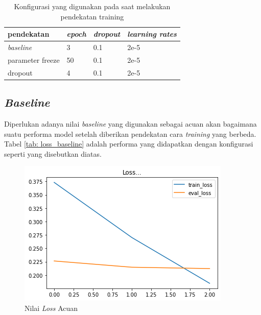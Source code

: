 \begin{table}[h]
    \centering
    \caption{Konfigurasi yang digunakan pada saat melakukan pendekatan training}
    \label{tab: training_config}
    \begin{tabular}{|l|l|l|l|}
        \hline
        \textbf{pendekatan} & \textit{\textbf{epoch}} & \textit{\textbf{dropout}} & \textit{\textbf{learning rates}} \\ \hline
        \textit{baseline}   & 3                       & 0.1                       & 2e-5                             \\ \hline
        parameter freeze    & 50                      & 0.1                       & 2e-5                             \\ \hline
        dropout             & 4                       & 0.1                       & 2e-5                             \\ \hline
    \end{tabular}
\end{table}

\subsection{\textit{Baseline}}

Diperlukan adanya nilai \textit{baseline} yang digunakan sebagai acuan akan bagaimana suatu performa model setelah diberikan pendekatan cara \textit{training} yang berbeda. Tabel \ref{tab: loss_baseline} adalah performa yang didapatkan dengan konfigurasi seperti yang disebutkan diatas.

\begin{figure}[h]
    \begin{center}
        \includegraphics[width= 0.9\linewidth]{gambar/loss_concat_awal.png}
        \caption{Nilai \textit{Loss} Acuan}
        \label{fig: loss_baseline}
    \end{center}
\end{figure}

